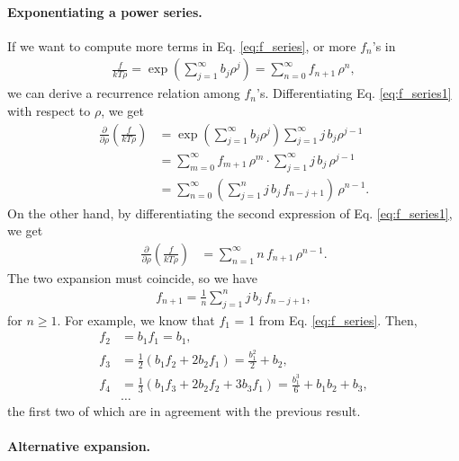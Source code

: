 \documentclass[twocolumn, 10pt]{article}
\numberwithin{equation}{section}
\newenvironment{solution}[1][\empty]
{\par\medskip\sffamily
  \textbf{\ifx\empty#1{Solution.}\relax\else{#1}\fi} \ignorespaces}
{\medskip}
\begin{document}
\begin{solution}
\paragraph*{Exponentiating a power series.}
  If we want to compute more terms in Eq. \eqref{eq:f_series},
  or more $f_n$'s in
  \begin{align}
    \frac{ f } { k T \rho }
    =
    \exp\left( \sum_{j=1}^\infty b_j\rho^j \right)
    =
    \sum_{n = 0}^\infty f_{n+1} \, \rho^n
    ,
    \label{eq:f_series1}
  \end{align}
  we can derive a recurrence relation among $f_n$'s.
  Differentiating Eq. \eqref{eq:f_series1}
  with respect to $\rho$, we get
  \begin{align*}
    \frac{\partial}{\partial \rho}
    \left( \frac{ f } { k T \rho } \right)
    &=
    \exp\left( \sum_{j=1}^\infty b_j\rho^j \right)
    \sum_{j=1}^\infty j \, b_j\rho^{j-1}
    \\
    &=
    \sum_{m=0}^\infty f_{m+1} \, \rho^m
    \cdot
    \sum_{j=1}^\infty j \, b_j \, \rho^{j-1}
    \\
    &=
    \sum_{n=0}^\infty
    \left(
    \sum_{j=1}^n
    j \, b_j \, f_{n-j+1}
    \right)
    \, \rho^{n - 1}
    .
  \end{align*}
  On the other hand,
  by differentiating the second expression of Eq. \eqref{eq:f_series1},
  we get
  \begin{align*}
    \frac{\partial}{\partial \rho}
    \left( \frac{ f } { k T \rho } \right)
    &=
    \sum_{n=1}^\infty
    n \, f_{n+1} \, \rho^{n-1}
    .
  \end{align*}
  The two expansion must coincide, so we have
  \begin{align}
    f_{n+1}
    =
    \frac{1}{n}
    \sum_{j=1}^n
    j \, b_j \, f_{n-j+1}
    ,
    \label{eq:f_recur}
  \end{align}
  for $n \ge 1$.
  For example, we know that  $f_1$ = 1 from Eq. \eqref{eq:f_series}.
  Then,
  \begin{align*}
  f_2 &= b_1 f_1 = b_1, \\
  f_3 &= \frac{1}{2}( b_1 f_2 + 2 b_2 f_1) = \frac{b_1^2}{2} + b_2, \\
  f_4 &= \frac{1}{3}( b_1 f_3 + 2 b_2 f_2 + 3 b_3 f_1)
    = \frac{b_1^3}{6} + b_1 b_2 + b_3, \\
  &\dots
  \end{align*}
  the first two of which are in agreement with the previous result.


\paragraph*{Alternative expansion.}


\end{solution}
\end{document}
